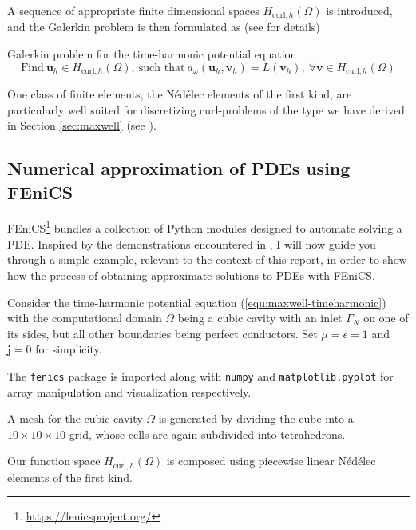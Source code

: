 \documentclass[11pt, a4paper]{article}
\begin{document}
A sequence of appropriate 
finite dimensional spaces $H_{\textrm{curl}, h}(\Omega)$ is introduced, and the
Galerkin problem is then formulated as (see \cite{numapproxPDEs} for details)
\begin{fancybox}{Galerkin problem for the time-harmonic potential equation}
    \begin{equation}
        \text{Find}~\mathbf{u}_h \in H_{\textrm{curl},h}(\Omega),~\text{such that}~a_{\omega}(\mathbf{u}_h, \mathbf{v}_h) = L(\mathbf{v}_h), ~\forall \mathbf{v} \in H_{\textrm{curl}, h}(\Omega) \label{equ:galerkin-problem}
    \end{equation}
\end{fancybox}
One class of finite elements, the Nédélec elements of the first
kind, are particularly well suited for discretizing curl-problems of the type
we have derived in Section \ref{sec:maxwell} (see \cite{monk}).

\subsection{Numerical approximation of \acrshort{PDE}s using FEniCS}
\label{subsec:fem-demo}

FEniCS\footnote{\url{https://fenicsproject.org/}} bundles a collection of Python
modules designed to automate solving a \acrfull{PDE}.
Inspired by the demonstrations encountered in \cite{fenics}, I will now guide you
through a simple example, relevant to the context of this report, in order to
show how the process of obtaining
approximate solutions to \acrshort{PDE}s with FEniCS.

Consider the time-harmonic potential equation (\ref{equ:maxwell-timeharmonic})
with the computational domain $\Omega$ being a cubic cavity with an inlet $\Gamma_N$
on one of its sides, but all other boundaries being perfect conductors.
Set $\mu = \epsilon = 1$ and $\mathbf{j} = 0$ for simplicity.

The \texttt{fenics} package is imported along with \texttt{numpy} and
\texttt{matplotlib.pyplot} for array manipulation and visualization respectively.


A mesh for the cubic cavity $\Omega$ is generated by dividing the cube into a
$10\times10\times10$ grid, whose cells are again subdivided into tetrahedrons.


Our function space $H_{\textrm{curl},h}(\Omega)$ is composed using piecewise
linear Nédélec elements of the first kind.

\end{document}
